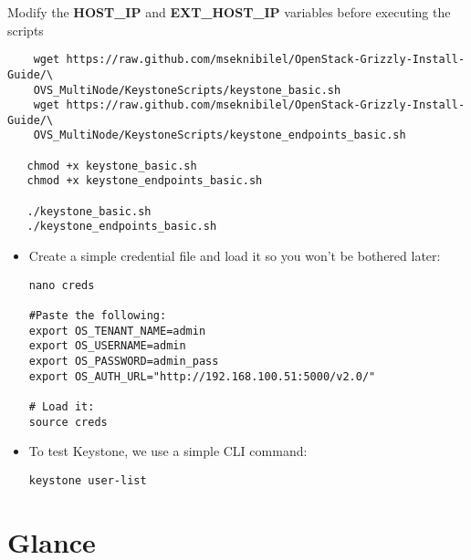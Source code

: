 Modify the \textbf{HOST\_IP} and \textbf{EXT\_HOST\_IP} variables before executing the scripts

\begin{verbatim}
    wget https://raw.github.com/mseknibilel/OpenStack-Grizzly-Install-Guide/\
    OVS_MultiNode/KeystoneScripts/keystone_basic.sh  
    wget https://raw.github.com/mseknibilel/OpenStack-Grizzly-Install-Guide/\
    OVS_MultiNode/KeystoneScripts/keystone_endpoints_basic.sh  

   chmod +x keystone_basic.sh  
   chmod +x keystone_endpoints_basic.sh  

   ./keystone_basic.sh  
   ./keystone_endpoints_basic.sh  
\end{verbatim}


\begin{itemize}
\item Create a simple credential file and load it so you won't be bothered later:

\begin{verbatim}
nano creds        

#Paste the following:
export OS_TENANT_NAME=admin
export OS_USERNAME=admin
export OS_PASSWORD=admin_pass
export OS_AUTH_URL="http://192.168.100.51:5000/v2.0/"

# Load it:
source creds
\end{verbatim}


\item To test Keystone, we use a simple CLI command:

\begin{verbatim}
keystone user-list
\end{verbatim}


\end{itemize}

\section{Glance}
\label{glance}

